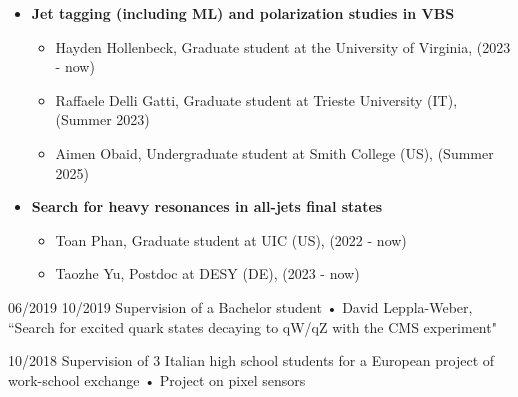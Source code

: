 {\begin{itemize}
\begin{itemize}
    \item Jack Peltier, Undergraduate student at Tennessee University, Knoxville (US),(Summer 2023)  
    \item Nicol\`{o} Salimbeni, Master student at University of Padova (IT), (2023 - now)
    \item Iqra Sohail, Graduate student at National Centre for Physics (PK) and LPC based, (2023 - now)
    \item Colby Thompson, Graduate student at Tennessee University, Knoxville (US),(Summer 2024)
    \item Adam Vendrasco, Graduate student at Tennessee University, Knoxville (US), (2025 - now)
    \item Sweta Baradia, Postdoc at UC Davis, California (US), (2025 - now)

    \end{itemize}
	\item {\bf Jet tagging (including ML) and polarization studies in VBS }
	\begin{itemize}
	\item Hayden Hollenbeck, Graduate student at the University of Virginia, (2023 - now)
	\item Raffaele Delli Gatti, Graduate student at Trieste University (IT), (Summer 2023)
	\item Aimen Obaid, Undergraduate student at Smith College (US), (Summer 2025)
	\end{itemize}
	\item {\bf Search for heavy resonances in all-jets final states}
	\begin{itemize}
	\item Toan Phan, Graduate student at UIC (US), (2022 - now)
	\item Taozhe Yu, Postdoc at DESY (DE), (2023 - now)
	\end{itemize}

    \end{itemize}
    }

  \teaching
    {06/2019 \textemdash{} 10/2019}
    {Supervision of a Bachelor student • }{David Leppla-Weber, ``Search for excited quark states decaying to qW/qZ with the CMS experiment"}
      
  \teaching
    {10/2018}
    {Supervision of 3 Italian high school students for a European project of work-school exchange • }
    {Project on pixel sensors}
\newpage
